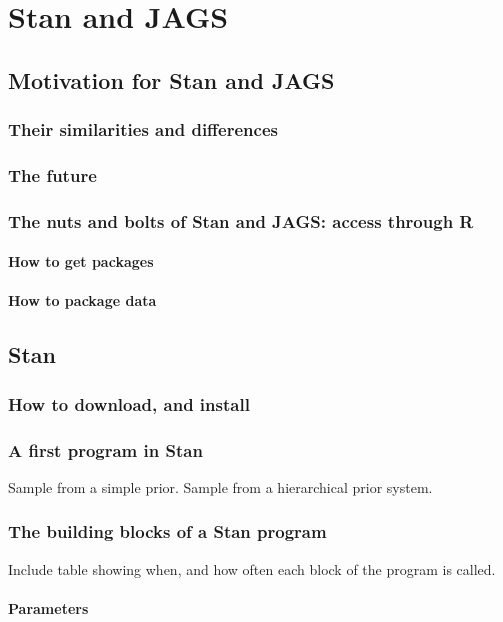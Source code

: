\documentclass[11pt,fullpage]{book}
\begin{document}
\chapter{Stan and JAGS}\label{chap:StanJAGS}
\section{Motivation for Stan and JAGS}
\subsection{Their similarities and differences}
\subsection{The future}

\subsection{The nuts and bolts of Stan and JAGS: access through R}
\subsubsection{How to get packages}
\subsubsection{How to package data}

\section{Stan}
\subsection{How to download, and install}
\subsection{A first program in Stan}
Sample from a simple prior. Sample from a hierarchical prior system.
\subsection{The building blocks of a Stan program}
Include table showing when, and how often each block of the program is called.
\subsubsection{Parameters}
\end{document}
